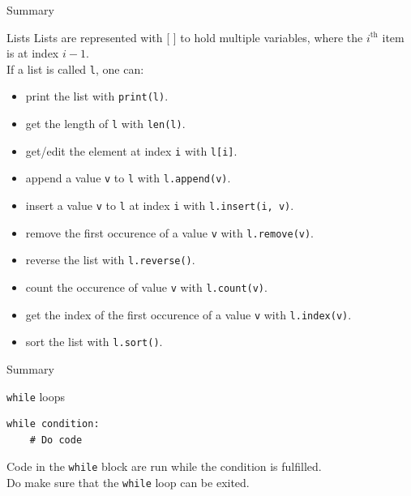 \documentclass[dvipsnames, svgnames, x11names, handout]{beamer}
\begin{document}
\begin{frame}[fragile]{Summary}
\vspace{-6pt}
\begin{block}{Lists}
Lists are represented with [ ] to hold multiple variables, where the $i^{\text{th}}$ item is at index $i - 1$.\\
If a list is called \texttt{l}, one can:
\begin{itemize}
    \item print the list with \texttt{print(l)}.
    \item get the length of \texttt{l} with \texttt{len(l)}.
    \item get/edit the element at index \texttt{i} with \texttt{l[i]}.
    \item append a value \texttt{v} to \texttt{l} with \texttt{l.append(v)}.
    \item insert a value \texttt{v} to \texttt{l} at index \texttt{i} with \texttt{l.insert(i, v)}.
    \item remove the first occurence of a value \texttt{v} with \texttt{l.remove(v)}.
    \item reverse the list with \texttt{l.reverse()}.
    \item count the occurence of value \texttt{v} with \texttt{l.count(v)}.
    \item get the index of the first occurence of a value \texttt{v} with \texttt{l.index(v)}.
    \item sort the list with \texttt{l.sort()}.
\end{itemize}
\end{block}
\end{frame}

\begin{frame}[fragile]{Summary}
\begin{block}{\texttt{while} loops}
\begin{verbatim}
while condition:
    # Do code
\end{verbatim}
Code in the \texttt{while} block are run while the condition is fulfilled.\\
Do make sure that the \texttt{while} loop can be exited.
\end{block}
\end{frame}
\end{document}
